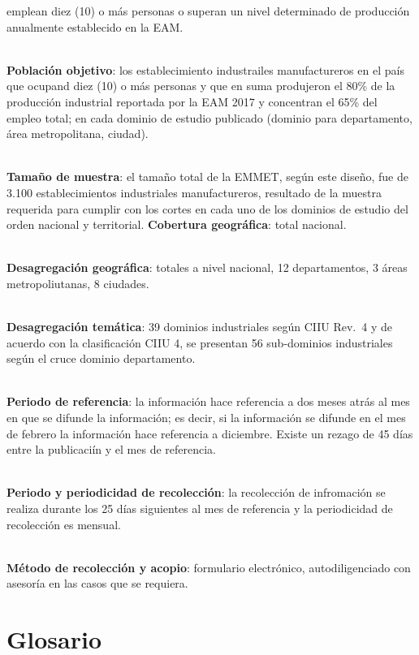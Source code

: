 \documentclass[
]{article}
\begin{document}
emplean diez (10) o más personas o superan un nivel determinado de
producción anualmente establecido en la EAM.\\
\strut \\
\textbf{Población objetivo}: los establecimiento industrailes
manufactureros en el país que ocupand diez (10) o más personas y que en
suma produjeron el 80\% de la producción industrial reportada por la EAM
2017 y concentran el 65\% del empleo total; en cada dominio de estudio
publicado (dominio para departamento, área metropolitana, ciudad).\\
\strut \\
\textbf{Tamaño de muestra}: el tamaño total de la EMMET, según este
diseño, fue de 3.100 establecimientos industriales manufactureros,
resultado de la muestra requerida para cumplir con los cortes en cada
uno de los dominios de estudio del orden nacional y territorial.
\textbf{Cobertura geográfica}: total nacional.\\
\strut \\
\textbf{Desagregación geográfica}: totales a nivel nacional, 12
departamentos, 3 áreas metropoliutanas, 8 ciudades.\\
\strut \\
\textbf{Desagregación temática}: 39 dominios industriales según CIIU
Rev.~4 y de acuerdo con la clasificación CIIU 4, se presentan 56
sub-dominios industriales según el cruce dominio departamento.\\
\strut \\
\textbf{Periodo de referencia}: la información hace referencia a dos
meses atrás al mes en que se difunde la información; es decir, si la
información se difunde en el mes de febrero la información hace
referencia a diciembre. Existe un rezago de 45 días entre la publicaciín
y el mes de referencia.\\
\strut \\
\textbf{Periodo y periodicidad de recolección}: la recolección de
infromación se realiza durante los 25 días siguientes al mes de
referencia y la periodicidad de recolección es mensual.\\
\strut \\
\textbf{Método de recolección y acopio}: formulario electrónico,
autodiligenciado con asesoría en las casos que se requiera.

\hypertarget{glosario}{%
\section{Glosario}\label{glosario}}
\end{document}
